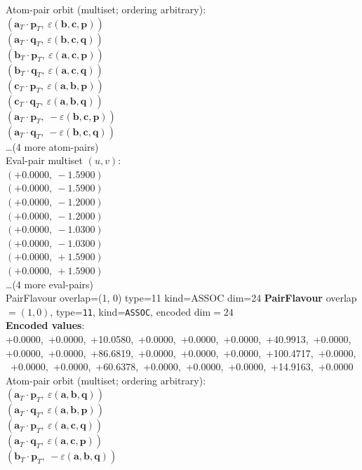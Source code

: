 \documentclass[a4paper,11pt]{article}
\newcommand{\fpbeomcfokjooi}[2]{\mathbf{#1}_T \cdot \mathbf{#2}_T}
\newcommand{\kblbmcpggoncpf}[3]{\varepsilon(\mathbf{#1},\mathbf{#2},\mathbf{#3})}
\begin{document}
\quad Atom-pair orbit (multiset; ordering arbitrary):\\
$(\fpbeomcfokjooi{a}{p},\ \kblbmcpggoncpf{b}{c}{p})$\\
$(\fpbeomcfokjooi{a}{q},\ \kblbmcpggoncpf{b}{c}{q})$\\
$(\fpbeomcfokjooi{b}{p},\ \kblbmcpggoncpf{a}{c}{p})$\\
$(\fpbeomcfokjooi{b}{q},\ \kblbmcpggoncpf{a}{c}{q})$\\
$(\fpbeomcfokjooi{c}{p},\ \kblbmcpggoncpf{a}{b}{p})$\\
$(\fpbeomcfokjooi{c}{q},\ \kblbmcpggoncpf{a}{b}{q})$\\
$(\fpbeomcfokjooi{a}{p},\ -\kblbmcpggoncpf{b}{c}{p})$\\
$(\fpbeomcfokjooi{a}{q},\ -\kblbmcpggoncpf{b}{c}{q})$\\
\quad \ldots (4 more atom-pairs)\\
\quad Eval-pair multiset $(u, v)$:\\
$(+0.0000,\ -1.5900)$\\
$(+0.0000,\ -1.5900)$\\
$(+0.0000,\ -1.2000)$\\
$(+0.0000,\ -1.2000)$\\
$(+0.0000,\ -1.0300)$\\
$(+0.0000,\ -1.0300)$\\
$(+0.0000,\ +1.5900)$\\
$(+0.0000,\ +1.5900)$\\
\quad \ldots (4 more eval-pairs)\\
    PairFlavour  overlap=(1, 0)  type=11  kind=ASSOC  dim=24
\textbf{PairFlavour} overlap$=(1, 0)$, type=\texttt{11}, kind=\texttt{ASSOC}, encoded dim$=24$\\
\textbf{      Encoded values}: +0.0000,\ +0.0000,\ +10.0580,\ +0.0000,\ +0.0000,\ +0.0000,\ +40.9913,\ +0.0000,\ +0.0000,\ +0.0000,\ +86.6819,\ +0.0000,\ +0.0000,\ +0.0000,\ +100.4717,\ +0.0000,\ +0.0000,\ +0.0000,\ +60.6378,\ +0.0000,\ +0.0000,\ +0.0000,\ +14.9163,\ +0.0000\\
\quad Atom-pair orbit (multiset; ordering arbitrary):\\
$(\fpbeomcfokjooi{a}{p},\ \kblbmcpggoncpf{a}{b}{q})$\\
$(\fpbeomcfokjooi{a}{q},\ \kblbmcpggoncpf{a}{b}{p})$\\
$(\fpbeomcfokjooi{a}{p},\ \kblbmcpggoncpf{a}{c}{q})$\\
$(\fpbeomcfokjooi{a}{q},\ \kblbmcpggoncpf{a}{c}{p})$\\
$(\fpbeomcfokjooi{b}{p},\ -\kblbmcpggoncpf{a}{b}{q})$\\
\end{document}
